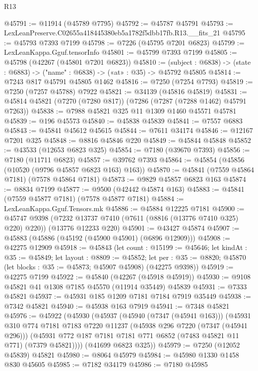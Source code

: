 \begin{lexlean}{R13}
\begin{coremodule}
@45791 := @11914 (@45789 @7795)
@45792 := @45787 @45791
@45793 := LexLeanPreserve.C02655a418445380eb5a1782f5dbb17fb.R13.__fits_21
@45795 := @45793 @7393 @7199
@45798 := @7226 (@45795 @7201 @6823)
@45799 := LexLeanKappa.Gguf.tensorInfo
@45801 := @45799 @7393 @7199
@45805 := @45798 (@42267 (@45801 @7201 @6823))
@45810 := (subject : @6838) -> (state : @6883) -> ("name" : @6838) -> («at» : @35) -> @45792 @45805
@45814 := @7243 @817 @45791 @45805 @1462
@45816 := @7250 (@7254 @7793)
@45819 := @7250 (@7257 @45788) @7922
@45821 := @34139 (@45816 @45819)
@45831 := @45814 @45821 (@7270 (@7280 @817)) (@7286 (@7287 (@7288 @1462) @45791 @7263))
@45838 := @7988 @45821 @325 @11 @1309 @1460 @45571 @45781
@45839 := @196 @45573
@45840 := @45838 @45839
@45841 := @7557 @6883
@45843 := @45841 @45612 @45615
@45844 := @7611 @34174
@45846 := @12167 @7201 @325
@45848 := @8816 @45846 @220
@45849 := @45844 @45848
@45852 := @43533 (@12653 @6823 @325)
@45854 := @7180 (@39670 @7393)
@45856 := @7180 (@11711 @6823)
@45857 := @39762 @7393
@45864 := @45854 (@45856 (@10520 (@9796 @45857 @6823 @163) @163))
@45870 := @45841 (@7559 @45864 @7181) (@7578 @45864 @7181)
@45873 := @9829 @45857 @6823 @163
@45874 := @8834 @7199
@45877 := @9500 (@42442 @45874 @163)
@45883 := @45841 (@7559 @45877 @7181) (@7578 @45877 @7181)
@45884 := LexLeanKappa.Gguf.Tensors.mk
@45886 := @45884 @12225 @7181
@45900 := @45747
    @9398
    (@7232 @13737 @7410 (@7611 (@8816 (@13776 @7410 @325) @220) @220))
    (@13776 @12233 @220)
@45901 := @43427 @45874
@45907 := @45883 (@45886 (@45192 (@45900 @45901) (@6896 @12909)))
@45908 := @42275 @12909
@45918 := @45843
    (let count : @15199 := @45646;
    let kindAt : @35 := @45849;
    let layout : @8809 := @45852;
    let per : @35 := @8820; @45870 (let blocks : @35 := @45873; @45907 @45908) (@42275 @9398))
@45919 := @42275 @7199
@45922 := @45840 (@42267 (@45918 @45919))
@45930 := @9108 @45821 @41 @1308 @7185 @45570 (@11914 @35449) @45839
@45931 := @7333 @45821
@45937 := @45931 @185 @1209 @7181 @7184 @7919 @35449
@45938 := @7342 @45821
@45940 := @45938 @163 @7919
@45941 := @7348 @45821
@45976 := @45922
    (@45930
      (@45937
        (@45940 (@7347 (@45941 @163)))
        (@45931
          @310
          @774
          @7181
          @7183
          @7220
          @11237
          (@45938 @296 @7220 (@7347 (@45941 @296)))
          (@45931 @772 @187 @7181 @7181 @771 @6852 (@7483 @45821 @11 @771) (@7379 @45821))))
      (@41699 @6823 @325))
@45979 := @7250 (@12052 @45839) @45821
@45980 := @8064 @45979
@45984 := @45980 @1330 @1458 @830 @45605
@45985 := @7182 @34179
@45986 := @7180 @45985

\end{coremodule}
\end{lexlean}
